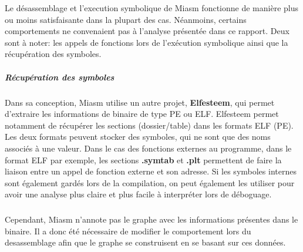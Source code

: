 Le désassemblage et l'execution symbolique de Miasm fonctionne de manière plus ou moins satisfaisante dans la plupart des cas. Néanmoins,
certains comportements ne convenaient pas à l'analyse présentée dans ce rapport. Deux sont à noter: les appels de fonctions lors de l'exécution symbolique ainsi que
la récupération des symboles.
\subparagraph{Récupération des symboles}
Dans sa conception, Miasm utilise un autre projet, \textbf{Elfesteem}, qui permet d'extraire les informations de binaire de type PE ou ELF. Elfesteem permet notamment
de récupérer les sections (dossier/table) dans les formats ELF (PE). Les deux formats peuvent stocker des symboles, qui ne sont que des noms associés à une valeur.
Dans le cas des fonctions externes au programme, dans le format ELF par exemple, les sections \textbf{.symtab} et \textbf{.plt} permettent de faire la liaison entre un appel de fonction
externe et son adresse. Si les symboles internes sont également gardés lors de la compilation, on peut également les utiliser pour avoir une analyse plus claire et plus facile à interpréter lors
de déboguage.
\subparagraph{}
Cependant, Miasm n'annote pas le graphe avec les informations présentes dans le binaire. Il a donc été nécessaire de modifier le comportement lors du desassemblage afin que le graphe se construisent
en se basant sur ces données.

